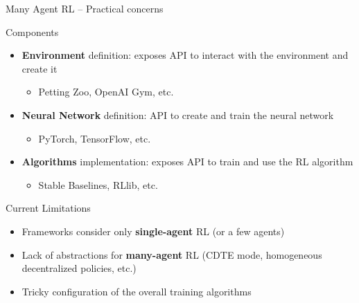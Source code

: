 \documentclass[presentation, 9pt]{beamer}\mode<presentation>{\usetheme{AMSBolognaFC}}
\begin{document}
\begin{frame}{Many Agent RL -- Practical concerns}
\begin{exampleblock}{Components}
	\begin{itemize}
		\item \textbf{Environment} definition: exposes API to interact with the environment and create it 
		\begin{itemize}
			\item Petting Zoo, OpenAI Gym, etc.
		\end{itemize}
		\item \textbf{Neural Network} definition: API to create and train the neural network
		\begin{itemize}
			\item PyTorch, TensorFlow, etc.
		\end{itemize}
		\item \textbf{Algorithms} implementation: exposes API to train and use the RL algorithm
		\begin{itemize}
			\item Stable Baselines, RLlib, etc.
		\end{itemize}
	\end{itemize}
\end{exampleblock}
\begin{alertblock}{Current Limitations}
	\begin{itemize}
		\item Frameworks consider only \textbf{single-agent} RL (or a few agents)
		\item Lack of abstractions for \textbf{many-agent} RL (CDTE mode, homogeneous decentralized policies, etc.)
		\item Tricky configuration of the overall training algorithms
	\end{itemize}
\end{alertblock}
\end{frame}
\end{document}
